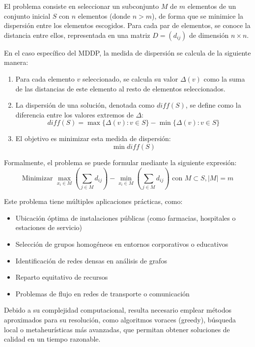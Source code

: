 \documentclass{article}
\begin{document}
El problema consiste en seleccionar un subconjunto \(M\) de \(m\) elementos de un conjunto inicial \(S\) con \(n\) elementos (donde \(n > m\)), de forma que se minimice la dispersión entre los elementos escogidos. Para cada par de elementos, se conoce la distancia entre ellos, representada en una matriz \(D = (d_{ij})\) de dimensión \(n \times n\).

En el caso específico del MDDP, la medida de dispersión se calcula de la siguiente manera:
\begin{enumerate}
    \item Para cada elemento \(v\) seleccionado, se calcula su valor \(\Delta(v)\) como la suma de las distancias de este elemento al resto de elementos seleccionados.
    \item La dispersión de una solución, denotada como \(diff(S)\), se define como la diferencia entre los valores extremos de \(\Delta\):
    \[diff(S) = \max\{\Delta(v) : v \in S\} - \min\{\Delta(v) : v \in S\}\]
    \item El objetivo es minimizar esta medida de dispersión:
    \[\min diff(S)\]
\end{enumerate}

Formalmente, el problema se puede formular mediante la siguiente expresión:
\[\text{Minimizar } \max_{x_i \in M} \left( \sum_{j \in M} d_{ij} \right) - \min_{x_i \in M} \left( \sum_{j \in M} d_{ij} \right) \text{ con } M \subset S, |M| = m\]

Este problema tiene múltiples aplicaciones prácticas, como:
\begin{itemize}
    \item Ubicación óptima de instalaciones públicas (como farmacias, hospitales o estaciones de servicio)
    \item Selección de grupos homogéneos en entornos corporativos o educativos
    \item Identificación de redes densas en análisis de grafos
    \item Reparto equitativo de recursos
    \item Problemas de flujo en redes de transporte o comunicación
\end{itemize}

Debido a su complejidad computacional, resulta necesario emplear métodos aproximados para su resolución, como algoritmos voraces (greedy), búsqueda local o metaheurísticas más avanzadas, que permitan obtener soluciones de calidad en un tiempo razonable.
\end{document}
